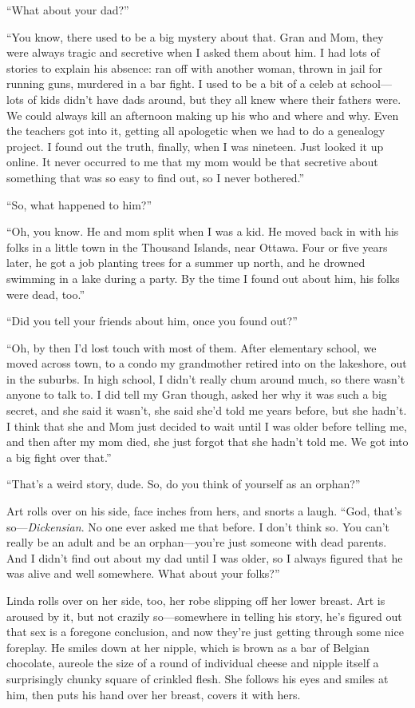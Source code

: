 “What about your dad?”

“You know, there used to be a big mystery about that. Gran and Mom,
they were always tragic and secretive when I asked them about him.
I had lots of stories to explain his absence: ran off with another
woman, thrown in jail for running guns, murdered in a bar fight. I
used to be a bit of a celeb at school—lots of kids didn’t have dads
around, but they all knew where their fathers were. We could always
kill an afternoon making up his who and where and why. Even the
teachers got into it, getting all apologetic when we had to do a
genealogy project. I found out the truth, finally, when I was
nineteen. Just looked it up online. It never occurred to me that my
mom would be that secretive about something that was so easy to
find out, so I never bothered.”

“So, what happened to him?”

“Oh, you know. He and mom split when I was a kid. He moved back in
with his folks in a little town in the Thousand Islands, near
Ottawa. Four or five years later, he got a job planting trees for a
summer up north, and he drowned swimming in a lake during a party.
By the time I found out about him, his folks were dead, too.”

“Did you tell your friends about him, once you found out?”

“Oh, by then I’d lost touch with most of them. After elementary
school, we moved across town, to a condo my grandmother retired
into on the lakeshore, out in the suburbs. In high school, I didn’t
really chum around much, so there wasn’t anyone to talk to. I did
tell my Gran though, asked her why it was such a big secret, and
she said it wasn’t, she said she’d told me years before, but she
hadn’t. I think that she and Mom just decided to wait until I was
older before telling me, and then after my mom died, she just
forgot that she hadn’t told me. We got into a big fight over
that.”

“That’s a weird story, dude. So, do you think of yourself as an
orphan?”

Art rolls over on his side, face inches from hers, and snorts a
laugh. “God, that’s so—\emph{Dickensian}. No one ever asked me that
before. I don’t think so. You can’t really be an adult and be an
orphan—you’re just someone with dead parents. And I didn’t find out
about my dad until I was older, so I always figured that he was
alive and well somewhere. What about your folks?”

Linda rolls over on her side, too, her robe slipping off her lower
breast. Art is aroused by it, but not crazily so—somewhere in
telling his story, he’s figured out that sex is a foregone
conclusion, and now they’re just getting through some nice
foreplay. He smiles down at her nipple, which is brown as a bar of
Belgian chocolate, aureole the size of a round of individual cheese
and nipple itself a surprisingly chunky square of crinkled flesh.
She follows his eyes and smiles at him, then puts his hand over her
breast, covers it with hers.

